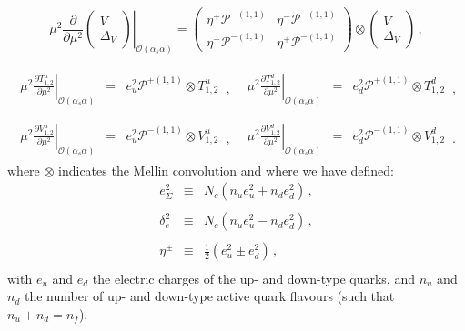 \begin{widetext}
\begin{equation}
\displaystyle\left.\mu^2\frac{\partial}{\partial \mu^2}
\begin{pmatrix}
V\\
\Delta_V
\end{pmatrix} \right|_{\mathcal{O}(\alpha_s \alpha)}= 
\begin{pmatrix}
\eta^+\mathcal{P}^{-(1,1)} & \eta^-\mathcal{P}^{-(1,1)} \\
\eta^-\mathcal{P}^{-(1,1)} & \eta^+\mathcal{P}^{-(1,1)} 
\end{pmatrix}\otimes
\begin{pmatrix}
V\\
\Delta_V
\end{pmatrix}\,,
\end{equation}

\begin{equation}
\begin{array}{ll}
\begin{array}{rcl}
\displaystyle \left.\mu^2\frac{\partial T^u_{1,2}}{\partial \mu^2}\right|_{\mathcal{O}(\alpha_s \alpha)} &=&
\displaystyle e_u^2\mathcal{P}^{+(1,1)}\otimes T^u_{1,2}
\end{array}\,, &
\begin{array}{rcl}
\displaystyle \left.\mu^2\frac{\partial T^d_{1,2}}{\partial \mu^2}\right|_{\mathcal{O}(\alpha_s \alpha)} &=&
\displaystyle e_d^2\mathcal{P}^{+(1,1)} \otimes T^d_{1,2}
\end{array}\,,
\\
\\
\begin{array}{rcl}
\displaystyle \left.\mu^2\frac{\partial V^u_{1,2}}{\partial \mu^2}\right|_{\mathcal{O}(\alpha_s \alpha)} &=&
\displaystyle e_u^2\mathcal{P}^{-(1,1)} \otimes V^u_{1,2}
\end{array}\,, &
\begin{array}{rcl}
\displaystyle \left.\mu^2\frac{\partial V^d_{1,2}}{\partial \mu^2}\right|_{\mathcal{O}(\alpha_s \alpha)} &=&
\displaystyle e_d^2\mathcal{P}^{-(1,1)}\otimes V^d_{1,2}
\end{array}\,.
\end{array}
\end{equation}
where $\otimes$ indicates the Mellin convolution and where we have
defined:
\begin{equation}
\begin{array}{rcl}
e_{\Sigma}^{2}& \equiv &\displaystyle
N_c(n_ue_{u}^{2}+n_de_{d}^{2})\,,\\
\\
\delta_e^2 & \equiv &\displaystyle N_c(n_u e_u^2 -n_d e_d^2)\,,\\
\\
\eta^{\pm} & \equiv & \displaystyle \frac{1}{2}\left(e_{u}^{2}\pm
  e_{d}^{2}\right)\,,\\
\end{array}
\end{equation}
with $e_u$ and $e_d$ the electric charges of the up- and down-type
quarks, and $n_u$ and $n_d$ the number of up- and down-type active
quark flavours (such that $n_u+n_d=n_f$).


\end{widetext}
